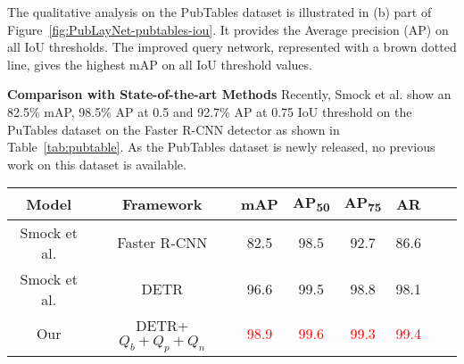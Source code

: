 \documentclass[sn-mathphys]{sn-jnl}\jyear{2021}\theoremstyle{thmstyleone}\newtheorem{theorem}{Theorem}\newtheorem{proposition}[theorem]{Proposition}\theoremstyle{thmstyletwo}\newtheorem{example}{Example}\newtheorem{remark}{Remark}\theoremstyle{thmstylethree}\newtheorem{definition}{Definition}\usepackage{amsmath}
\begin{document}
The qualitative analysis on the PubTables dataset is illustrated in (b) part of Figure~\ref{fig:PubLayNet-pubtables-iou}. It provides the Average precision (AP) on all IoU thresholds. The improved query network, represented with a brown dotted line, gives the highest mAP on all IoU threshold values. 

\noindent\textbf{Comparison with State-of-the-art Methods}
Recently, Smock et al.\cite {pubtables5} show an 82.5$\%$ mAP, 98.5$\%$ AP at 0.5 and 92.7$\%$ AP at 0.75 IoU threshold on the PuTables dataset on the Faster R-CNN detector as shown in Table~\ref{tab:pubtable}. As the PubTables dataset is newly released, no previous work on this dataset is available. 


\begin{table*}
\tiny
\begin{center}
\caption{Comparison between the transformer-based detectors and previous state-of-the-art results on PubTables dataset \colorbox{red!25}{without pre-processing} (raw data). Here, term $Q_b$ represents object queries as anchor boxes, $Q_p$ denotes object queries with positive noise and $Q_n$ indicates object queries with negative noise. The best results are exhibited.}\label{tab:pubtable}\begin{tabular*}{\textwidth}
{@{\extracolsep{\fill}}cccccccc@{\extracolsep{\fill}}}
\toprule
\textbf{Model} &
\textbf{Framework} &
\textbf{mAP} &
\textbf{AP\textsubscript{50}} &
\textbf{AP\textsubscript{75}} &
\textbf{AR}\\
\midrule

Smock et al.\cite {pubtables5} & Faster R-CNN & 82.5 & 98.5 & 92.7 & 86.6 \\

\midrule
Smock et al.\cite {pubtables5} & DETR & 96.6 & 99.5 & 98.8 & 98.1 \\ 
\midrule 
Our & DETR+ $Q_b + Q_p + Q_n$ & \textcolor{red}{98.9} & \textcolor{red}{99.6} & \textcolor{red}{99.3} & \textcolor{red}{99.4}\\

\bottomrule
\end{tabular*}
\end{center}
\end{table*}
\end{document}
